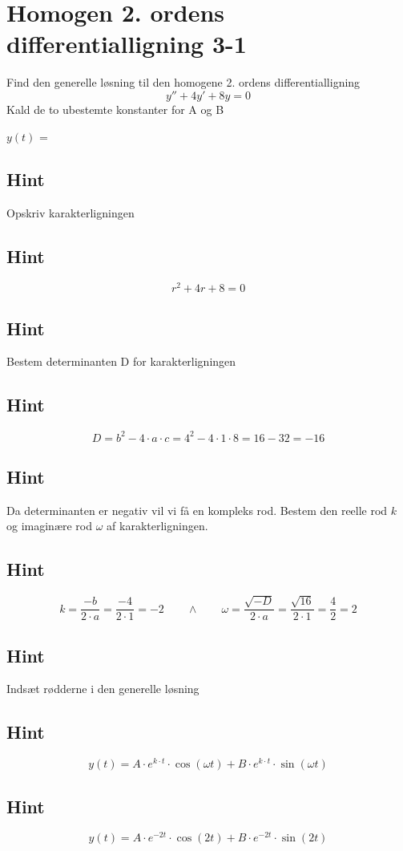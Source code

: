 \documentclass{article}
\newenvironment{exercise}[1]{\newpage\section{#1}}{}
\newcommand{\answerbox}[1]{\fbox{$#1$}}
\newcommand{\hint}{\subsection*{Hint}}
\begin{document}
\begin{exercise}{Homogen 2. ordens differentialligning 3-1}
	
	Find den generelle løsning til den homogene 2. ordens differentialligning
	\[
	y'' + 4y' + 8y = 0
	\]
	Kald de to ubestemte konstanter for A og B
	
	$y(t)$ = \answerbox{A \cdot e^{-2 t}  \cdot \cos(2 t)+ B \cdot e^{-2 t}  \cdot \sin(2 t)}
	
	
	\hint 
	
	Opskriv karakterligningen
	
	\hint
	
	\[
	r^2+ 4r + 8 = 0
	\]
	
	
	\hint
	
	Bestem determinanten D for karakterligningen
	
	
	\hint 
	\[
	D = b^2 - 4 \cdot a \cdot c = 4^2 - 4 \cdot 1 \cdot 8  = 16 -32 = -16
	\]
	
	\hint 
	Da determinanten er negativ vil vi få en kompleks rod. Bestem den reelle rod $k$ og imaginære rod $\omega$ af karakterligningen.
	
	
	\hint
	
	\[
	k = \frac{-b}{2 \cdot a} = \frac{-4}{2 \cdot 1} = -2 \qquad \wedge \qquad \omega = \frac{\sqrt{-D}}{2 \cdot a} = \frac{\sqrt{16}}{2 \cdot 1} = \frac{4}{2} = 2
	\]
	
	\hint
	
	Indsæt rødderne i den generelle løsning
	
	\hint
	\[
	y(t) = A \cdot e^{k \cdot t}  \cdot \cos(\omega t)+ B \cdot e^{k \cdot t}  \cdot \sin(\omega t)
	\]
	
	\hint
	
	\[
	y(t) = A \cdot e^{-2 t}  \cdot \cos(2 t)+ B \cdot e^{-2 t}  \cdot \sin(2 t)
	\]
	
\end{exercise}

\newpage
\end{document}
